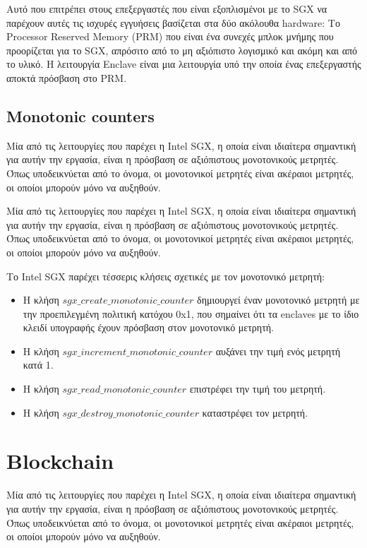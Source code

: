 Αυτό που επιτρέπει στους επεξεργαστές που είναι εξοπλισμένοι με το SGX να παρέχουν αυτές τις ισχυρές εγγυήσεις βασίζεται στα δύο ακόλουθα hardware: Το Processor Reserved Memory (PRM) που είναι ένα συνεχές μπλοκ μνήμης που προορίζεται για το SGX, απρόσιτο από το μη αξιόπιστο λογισμικό και ακόμη και από το υλικό. Η λειτουργία Enclave είναι μια λειτουργία υπό την οποία ένας επεξεργαστής αποκτά πρόσβαση στο PRM.


\subsection{Monotonic counters}
Μία από τις λειτουργίες που παρέχει η Intel SGX, η οποία είναι ιδιαίτερα σημαντική για αυτήν την εργασία, είναι η πρόσβαση σε αξιόπιστους μονοτονικούς μετρητές. Όπως υποδεικνύεται από το όνομα, οι μονοτονικοί μετρητές είναι ακέραιοι μετρητές, οι οποίοι μπορούν μόνο να αυξηθούν.

Μία από τις λειτουργίες που παρέχει η Intel SGX, η οποία είναι ιδιαίτερα σημαντική για αυτήν την εργασία, είναι η πρόσβαση σε αξιόπιστους μονοτονικούς μετρητές. Όπως υποδεικνύεται από το όνομα, οι μονοτονικοί μετρητές είναι ακέραιοι μετρητές, οι οποίοι μπορούν μόνο να αυξηθούν.

Το Intel SGX παρέχει τέσσερις κλήσεις σχετικές με τον μονοτονικό μετρητή:
\begin{itemize}[noitemsep]
\item Η κλήση $sgx\_create\_monotonic\_counter$ δημιουργεί έναν μονοτονικό μετρητή με την προεπιλεγμένη πολιτική κατόχου 0x1, που σημαίνει ότι τα enclaves με το ίδιο κλειδί υπογραφής έχουν πρόσβαση στον μονοτονικό μετρητή.
\item Η κλήση $sgx\_increment\_monotonic\_counter$ αυξάνει την τιμή ενός μετρητή κατά 1.
\item Η κλήση $sgx\_read\_monotonic\_counter$ επιστρέφει την τιμή του μετρητή.
\item Η κλήση $sgx\_destroy\_monotonic\_counter$ καταστρέφει τον μετρητή.
\end{itemize}

\section{Blockchain}
Μία από τις λειτουργίες που παρέχει η Intel SGX, η οποία είναι ιδιαίτερα σημαντική για αυτήν την εργασία, είναι η πρόσβαση σε αξιόπιστους μονοτονικούς μετρητές. Όπως υποδεικνύεται από το όνομα, οι μονοτονικοί μετρητές είναι ακέραιοι μετρητές, οι οποίοι μπορούν μόνο να αυξηθούν.

